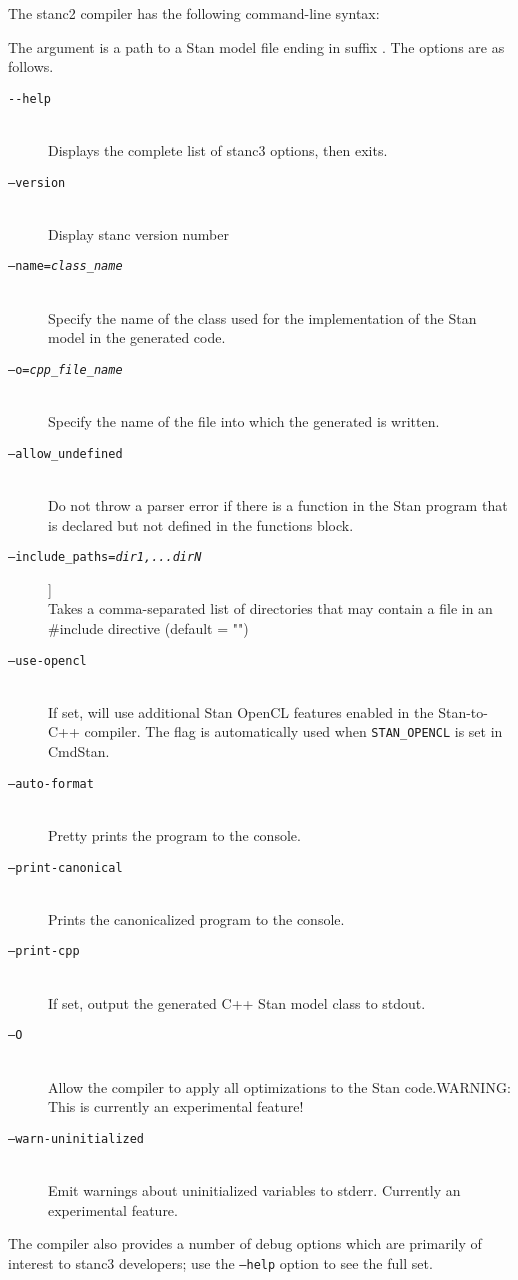 The stanc2 compiler has the following command-line syntax:
%
\begin{quote}
\end{quote}
%
The argument  is a path to a Stan model
file ending in suffix .  The options are as follows.
%
\begin{description}
%
\item[\tt {-}-help] 
\mbox{ } \\ 
Displays the complete list of stanc3 options, then exits.
%
\item[\tt  --version]
\mbox{ } \\ 
 Display stanc version number
%
\item[\tt  --name={\slshape class\_name}]
\mbox{ } \\ 
Specify the name of the class used for the implementation of the
Stan model in the generated \Cpp code.  
%
\item[\tt --o={\slshape cpp\_file\_name}]
\mbox{} \\
Specify the name of the file into which the generated \Cpp is written.
%
\item[\tt  --allow\_undefined]
\mbox{ } \\ 
Do not throw a parser error if there is a function in the Stan program
that is declared but not defined in the functions block.
%
\item[\tt  --include\_paths={\slshape dir1,...dirN}]]
\mbox{ } \\ 
Takes a comma-separated list of directories that may contain a file in an \#include directive (default = "")
%
\item[\tt  --use-opencl]
\mbox{ } \\ 
If set, will use additional Stan OpenCL features enabled in the Stan-to-C++ compiler. The flag is automatically used when {\tt STAN\_OPENCL} is set in CmdStan.
%
\item[\tt --auto-format]
\mbox{ } \\ 
 Pretty prints the program to the console.
%
\item[\tt  --print-canonical]
\mbox{ } \\ 
 Prints the canonicalized program to the console.
%
\item[\tt  --print-cpp]
\mbox{ } \\ 
If set, output the generated C++ Stan model class to stdout.
%
\item[\tt  --O ]
\mbox{ } \\ 
Allow the compiler to apply all optimizations to the Stan code.WARNING: This is currently an experimental feature!
%
\item[\tt  --warn-uninitialized]
\mbox{ } \\ 
Emit warnings about uninitialized variables to stderr. Currently an experimental feature.
\end{description}
%
The compiler also provides a number of debug options which are
primarily of interest to stanc3 developers; use the {\tt --help}  option
to see the full set.


